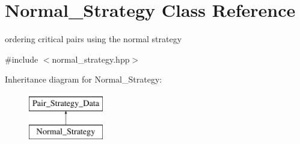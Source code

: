 \hypertarget{class_normal___strategy}{}\section{Normal\+\_\+\+Strategy Class Reference}
\label{class_normal___strategy}


ordering critical pairs using the normal strategy  




{\ttfamily \#include $<$normal\+\_\+strategy.\+hpp$>$}

Inheritance diagram for Normal\+\_\+\+Strategy\+:\begin{figure}[H]
\begin{center}
\leavevmode
\includegraphics[height=2.000000cm]{class_normal___strategy}
\end{center}
\end{figure}
